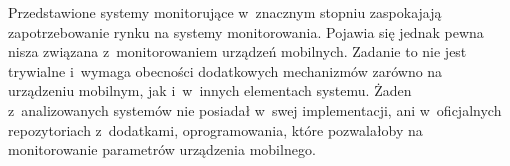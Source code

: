 Przedstawione systemy monitorujące w~znacznym stopniu zaspokajają
zapotrzebowanie rynku na systemy monitorowania. Pojawia się jednak
pewna nisza związana z~monitorowaniem urządzeń mobilnych. Zadanie to
nie jest trywialne i~wymaga obecności dodatkowych mechanizmów zarówno
na urządzeniu mobilnym, jak i~w~innych elementach systemu. Żaden
z~analizowanych systemów nie posiadał w~swej implementacji, ani
w~oficjalnych repozytoriach z~dodatkami, oprogramowania, które
pozwalałoby na monitorowanie parametrów urządzenia mobilnego.

